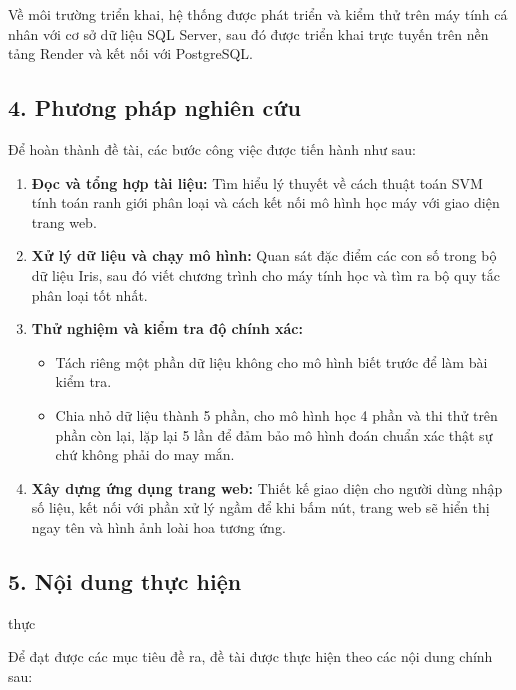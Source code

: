 \documentclass[14pt]{extarticle}
\begin{document}
		  \noindent Về môi trường triển khai, hệ thống được phát triển và kiểm thử trên máy tính cá nhân với cơ sở dữ liệu SQL Server, sau đó được triển khai trực tuyến trên nền tảng Render và kết nối với PostgreSQL.\\
		 
\subsection*{4. Phương pháp nghiên cứu}
		 
		  \noindent Để hoàn thành đề tài, các bước công việc được tiến hành như sau:
		   \vspace{-0.5em}
		   \begin{enumerate}[leftmargin=*]
		   	\item \textbf{Đọc và tổng hợp tài liệu:} Tìm hiểu lý thuyết về cách thuật toán SVM tính toán ranh giới phân loại và cách kết nối mô hình học máy với giao diện trang web.
		   	\item \textbf{Xử lý dữ liệu và chạy mô hình:} Quan sát đặc điểm các con số trong bộ dữ liệu Iris, sau đó viết chương trình cho máy tính học và tìm ra bộ quy tắc phân loại tốt nhất.
		   	\item \textbf{Thử nghiệm và kiểm tra độ chính xác:}
		   		 \vspace{-1em}
		   	\begin{itemize}
		   		\item Tách riêng một phần dữ liệu không cho mô hình biết trước để làm bài kiểm tra.
		   		\item Chia nhỏ dữ liệu thành 5 phần, cho mô hình học 4 phần và thi thử trên phần còn lại, lặp lại 5 lần để đảm bảo mô hình đoán chuẩn xác thật sự chứ không phải do may mắn.
		   	\end{itemize}
		   	 \vspace{-1em}
		   	\item \textbf{Xây dựng ứng dụng trang web:} Thiết kế giao diện cho người dùng nhập số liệu, kết nối với phần xử lý ngầm để khi bấm nút, trang web sẽ hiển thị ngay tên và hình ảnh loài hoa tương ứng.
		   \end{enumerate}
		   \newpage
		   
\subsection*{ 5. Nội dung thực hiện}
thực
		   
		   Để đạt được các mục tiêu đề ra, đề tài được thực hiện theo các nội dung chính sau:
		   
\end{document}
